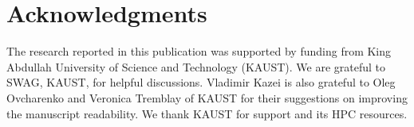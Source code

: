 \section{Acknowledgments}
The research reported in this publication was supported by funding from King Abdullah University of Science and Technology (KAUST). We are grateful to SWAG, KAUST, for helpful discussions. Vladimir Kazei is also grateful to Oleg Ovcharenko and Veronica Tremblay of KAUST for their suggestions on improving the manuscript readability. We thank KAUST for support and its HPC resources. 

